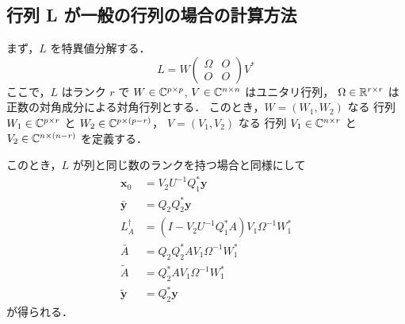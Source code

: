 \subsection{行列 L が一般の行列の場合の計算方法}

まず，$L$ を特異値分解する．
\begin{equation}
    L = W
    \begin{pmatrix}
        \Omega & O \\
        O      & O
    \end{pmatrix}
    V^*
\end{equation}
ここで，$L$ はランク $r$ で
$W \in \mathbb{C}^{p \times p}$,
$V \in \mathbb{C}^{n \times n}$
はユニタリ行列，
$\Omega \in \mathbb{R}^{r \times r}$
は正数の対角成分による対角行列とする．
このとき，$W = (W_1, W_2)$ なる
行列 $W_1 \in \mathbb{C}^{p \times r}$ と $W_2 \in \mathbb{C}^{p \times (p-r)}$，
$V = (V_1, V_2)$ なる
行列 $V_1 \in \mathbb{C}^{n \times r}$ と $V_2 \in \mathbb{C}^{n \times (n-r)}$
を定義する．

このとき，$L$ が列と同じ数のランクを持つ場合と同様にして
\begin{align}
    \bm{x}_0       & = V_2 U^{-1} Q_1^* \bm{y}                        \\
    \bar{\bm{y}}   & = Q_2 Q_2^* \bm{y}                               \\
    L_A^\dagger    & = (I - V_2 U^{-1} Q_1^* A) V_1 \Omega^{-1} W_1^* \\
    \bar{A}        & = Q_2 Q_2^* A V_1 \Omega^{-1} W_1^*              \\
    \tilde{A}      & = Q_2^* A V_1 \Omega^{-1} W_1^*                  \\
    \tilde{\bm{y}} & = Q_2^* \bm{y}
\end{align}
が得られる．
